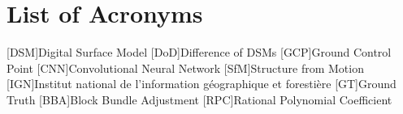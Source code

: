 
\chapter*{List of Acronyms}



\begin{acronym}
	[DSM]{Digital Surface Model}
	[DoD]{Difference of DSMs}
	[GCP]{Ground Control Point}
	[CNN]{Convolutional Neural Network}
	[SfM]{Structure from Motion}
	[IGN]{Institut national de l'information géographique et forestière}
	[GT]{Ground Truth}
	[BBA]{Block Bundle Adjustment}
	[RPC]{Rational Polynomial Coefficient}
\end{acronym}

%
%


